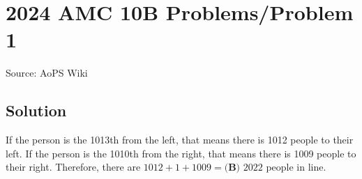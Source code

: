 \documentclass[12pt]{article}
\begin{document}
\section*{{2024 AMC 10B Problems/Problem 1}}
Source: AoPS Wiki

\subsection*{Solution}
If the person is the 1013th from the left, that means there is 1012 people to their left.
If the person is the 1010th from the right, that means there is 1009 people to their right.
Therefore, there are $1012 + 1 + 1009 = \boxed{\textbf{(B) } 2022}$ people in line.
\end{document}
